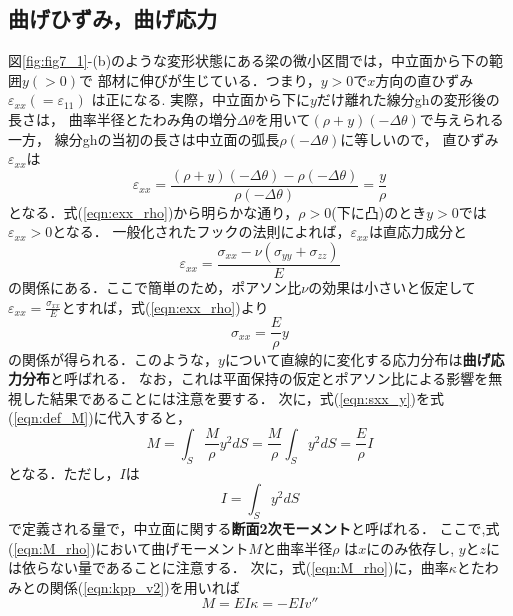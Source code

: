 \documentclass[10pt,a4j]{jbook}
\begin{document}
\subsection{曲げひずみ，曲げ応力}
図\ref{fig:fig7_1}-(b)のような変形状態にある梁の微小区間では，中立面から下の範囲$y(>0)$で
部材に伸びが生じている．つまり，$y>0$で$x$方向の直ひずみ$\varepsilon_{xx}(=\varepsilon_{11})$
は正になる. 実際，中立面から下に$y$だけ離れた線分ghの変形後の長さは，
曲率半径とたわみ角の増分$\Delta \theta$を用いて$(\rho + y )(-\Delta \theta)$で与えられる一方，
線分ghの当初の長さは中立面の弧長$\rho (-\Delta \theta)$に等しいので，
直ひずみ$\varepsilon_{xx}$は
\begin{equation}
	\varepsilon_{xx}
	=
	\frac{(\rho +y )(-\Delta \theta) - \rho (-\Delta \theta)}{\rho (-\Delta \theta)}
	=
	\frac{y}{\rho}
	\label{eqn:exx_rho}
\end{equation}
となる．式(\ref{eqn:exx_rho})から明らかな通り，$\rho>0$(下に凸)のとき$y>0$では$\varepsilon_{xx}>0$となる．
一般化されたフックの法則によれば，$\varepsilon_{xx}$は直応力成分と
\begin{equation}
	\varepsilon_{xx}=\frac{\sigma_{xx}-\nu(\sigma_{yy}+\sigma_{zz})}{E}
\end{equation}
の関係にある．ここで簡単のため，ポアソン比$\nu$の効果は小さいと仮定して
$\varepsilon_{xx}=\frac{\sigma_{xx}}{E}$とすれば，式(\ref{eqn:exx_rho})より
\begin{equation}
	\sigma_{xx}=\frac{E}{\rho}y
	\label{eqn:sxx_y}
\end{equation}
の関係が得られる．このような，$y$について直線的に変化する応力分布は{\bf 曲げ応力分布}と呼ばれる．
なお，これは平面保持の仮定とポアソン比による影響を無視した結果であることには注意を要する．
次に，式(\ref{eqn:sxx_y})を式(\ref{eqn:def_M})に代入すると，
\begin{equation}
	M=\int_S \frac{M}{\rho}y^2 dS
	=
	\frac{M}{\rho}\int_S y^2 dS
	=
	\frac{E}{\rho}I
	\label{eqn:M_rho}
\end{equation}
となる．ただし，$I$は
\begin{equation}
	I=\int_S y^2 dS
	\label{eqn:def_I}
\end{equation}
で定義される量で，中立面に関する{\bf 断面2次モーメント}と呼ばれる．
ここで,式(\ref{eqn:M_rho})において曲げモーメント$M$と曲率半径$\rho$
は$x$にのみ依存し, $y$と$z$には依らない量であることに注意する．
次に，式(\ref{eqn:M_rho})に，曲率$\kappa$とたわみとの関係(\ref{eqn:kpp_v2})を用いれば
\begin{equation}
	M = EI \kappa = -EIv''
	\label{eqn:M_kpp}
\end{equation}
\end{document}
